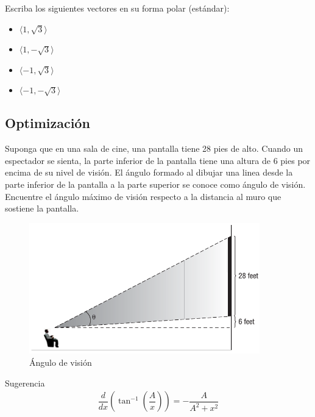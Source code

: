 {}
	\begin{problema}
		Escriba los siguientes vectores en su forma polar (estándar):
		\begin{itemize}
			\item $\langle 1, \sqrt{3}\rangle$ 
			\item $\langle 1, -\sqrt{3}\rangle$ 
			\item $\langle -1, \sqrt{3}\rangle$ 
			\item $\langle -1, -\sqrt{3}\rangle$ 
		\end{itemize}
		
	\end{problema}
	

\subsection{Optimización}

	\begin{problema}
		\label{exe:0776}
		Suponga que en una sala de cine, una pantalla tiene 28 pies de alto. Cuando un espectador se sienta, la parte inferior de la pantalla tiene una altura de 6 pies por encima de su nivel de visión. El ángulo formado al dibujar una linea desde la parte inferior de la pantalla a la parte superior se conoce como ángulo de visión. Encuentre el ángulo máximo de visión respecto a la distancia al muro que sostiene la pantalla.
	\end{problema}


{}
	\begin{figure}[h]
		\centering
		\includegraphics[width=10cm]{./trig/angulo_vision.png}
		\caption{Ángulo de visión}
		\label{fig:angulo_vision}
	\end{figure}
	

{Sugerencia}
	\begin{align*}
		\dfrac{d}{dx}\left( \tan^{-1}\left( \dfrac{A}{x} \right) \right)=
		-\dfrac{A}{A^{2}+x^{2}}
	\end{align*}

